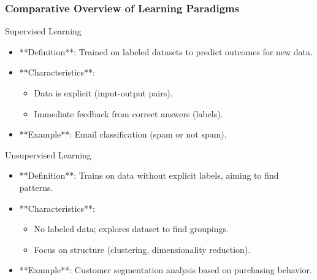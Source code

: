\documentclass[aspectratio=169]{beamer}
\begin{document}
\begin{frame}[fragile]
    \frametitle{Comparative Overview of Learning Paradigms}
    \begin{block}{Supervised Learning}
        \begin{itemize}
            \item **Definition**: Trained on labeled datasets to predict outcomes for new data.
            \item **Characteristics**:
                \begin{itemize}
                    \item Data is explicit (input-output pairs).
                    \item Immediate feedback from correct answers (labels).
                \end{itemize}
            \item **Example**: Email classification (spam or not spam).
        \end{itemize}
    \end{block}
  
    \begin{block}{Unsupervised Learning}
        \begin{itemize}
            \item **Definition**: Trains on data without explicit labels, aiming to find patterns.
            \item **Characteristics**:
                \begin{itemize}
                    \item No labeled data; explores dataset to find groupings.
                    \item Focus on structure (clustering, dimensionality reduction).
                \end{itemize}
            \item **Example**: Customer segmentation analysis based on purchasing behavior.
        \end{itemize}
    \end{block}
\end{frame}
\end{document}
